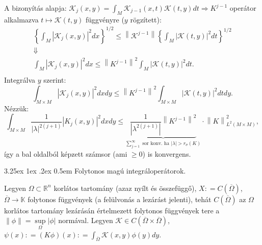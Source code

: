 \documentclass[12pt,a4paper]{scrartcl}
\makeatletter
\renewcommand\paragraph{\@startsection{paragraph}{4}{\z@}%
                                    {3.25ex \@plus1ex \@minus.2ex}%
                                    {0.5em} %
                                    {\normalfont\normalsize\bfseries}}
\makeatother
\begin{document}
A bizonyítás alapja:
\(\left. \mathcal{K}_{j}\left( {x,y} \right) = {\int_{M}{\mathcal{K}_{j - 1}\left( {x,t} \right)\mathcal{K}\left( {t,y} \right)dt}}\Rightarrow K^{j - 1} \right.\)
operátor alkalmazva
\(\left. t\mapsto\mathcal{K}\left( {t,y} \right) \right.\) függvényre
(\(y\) rögzített): \[\begin{gathered}
  {\left\{ {\int_M {{{\left| {{\mathcal{K}_j}\left( {x,y} \right)} \right|}^2}dx} } \right\}^{1/2}} \leqslant \left\| {{\mathcal{K}^{j - 1}}} \right\|{\left\{ {\int_M {{{\left| {\mathcal{K}\left( {t,y} \right)} \right|}^2}dt} } \right\}^{1/2}} \\ 
   \Downarrow  \\ 
  \int_M {{{\left| {{\mathcal{K}_j}\left( {x,y} \right)} \right|}^2}dx}  \leqslant {\left\| {{K^{j - 1}}} \right\|^2}\int_M {{{\left| {\mathcal{K}\left( {t,y} \right)} \right|}^2}dt} . \\ 
\end{gathered} \] Integrálva \(y\) szerint:
\[{\int_{M \times M}{\left| {\mathcal{K}_{j}\left( {x,y} \right)} \right|^{2}dxdy}} \leq \left\| K^{j - 1} \right\|^{2}{\int_{M \times M}{\left| {\mathcal{K}\left( {t,y} \right)} \right|^{2}dtdy}}.\]
Nézzük:
\[\int_{M \times M} {\frac{1}{{{{\left| \lambda  \right|}^{2\left( {j + 1} \right)}}}}{{\left| {{K_j}\left( {x,y} \right)} \right|}^2}dxdy}  \leqslant \underbrace {\frac{1}{{\left| {{\lambda ^{2\left( {j + 1} \right)}}} \right|}}{{\left\| {{K^{j - 1}}} \right\|}^2}}_{\sum\limits_{j = 1}^\infty  {{\text{ sor konv}}{\text{. ha }}\left| \lambda  \right| > {r_\sigma }\left( K \right)} } \cdot \left\| K \right\|_{{L^2}\left( {M \times M} \right)}^2,\]így
a bal oldalból képzett számsor (ami \(\geq 0\)) is konvergens.

\hypertarget{folytonos-magu-integraloperatorok.}{%
\paragraph{Folytonos magú
integráloperátorok.}\label{folytonos-magu-integraloperatorok.}}

Legyen \(\Omega \subset {\mathbb{R}}^{n}\) korlátos tartomány (azaz
nyílt és összefüggő), \(X: = C\left( \overline{\Omega} \right)\),
\(\left. \overline{\Omega}\rightarrow{\mathbb{K}} \right.\) folytonos
függvények (a felülvonás a lezárást jelenti), tehát
\(C\left( \overline{\Omega} \right)\) az \(\Omega\) korlátos tartomány
lezárásán értelmezett folytonos függvények tere a
\(\left\| \phi \right\| = \sup\limits_{\Omega}\left| \phi \right|\)
normával. Legyen
\(\mathcal{K} \in C\left( {\overline{\Omega} \times \overline{\Omega}} \right)\),
\(\psi\left( x \right): = \left( {K\phi} \right)\left( x \right): = {\int_{\overline{\Omega}}{\mathcal{K}\left( {x,y} \right)\phi\left( y \right)}}dy\).
\end{document}
